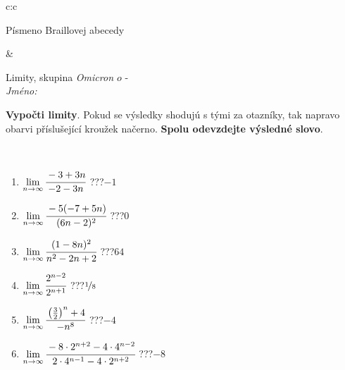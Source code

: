 \documentclass[10pt]{report}
\newcommand\omicron{o}
\begin{document}
\begin{tabular}{c:c}
\begin{minipage}[c][104.5mm][t]{0.5\linewidth}
\begin{center}
\begin{minipage}{0.20\linewidth}
\begin{center}
{\small Písmeno Braillovej abecedy}
\end{center}
\end{minipage}
\end{center}
\end{minipage}
&
\begin{minipage}[c][104.5mm][t]{0.5\linewidth}
\begin{center}
\vspace{7mm}
{\huge Limity, skupina \textit{Omicron $\omicron$} -}\\[5mm]
\textit{Jméno:}\phantom{xxxxxxxxxxxxxxxxxxxxxxxxxxxxxxxxxxxxxxxxxxxxxxxxxxxxxxxxxxxxxxxxx}\\[5mm]
\begin{minipage}{0.95\linewidth}
\begin{center}
\textbf{Vypočti limity}. Pokud se výsledky shodujú s tými za otazníky, tak napravo\\obarvi příslušející kroužek načerno. \textbf{Spolu odevzdejte výsledné slovo}.
\end{center}
\end{minipage}
\\[1mm]
\begin{minipage}{0.79\linewidth}
\begin{center}
\begin{varwidth}{\linewidth}
\begin{enumerate}
\normalsize
\item $\lim\limits_{n\to\infty}\cfrac{-3+3n}{-2-3n}$\quad \dotfill\; ???\;\dotfill \quad $-1$
\item $\lim\limits_{n\to\infty}\cfrac{-5(-7+5n)}{(6n-2)^2}$\quad \dotfill\; ???\;\dotfill \quad $0$
\item $\lim\limits_{n\to\infty}\cfrac{(1-8n)^2}{n^2-2n+2}$\quad \dotfill\; ???\;\dotfill \quad $64$
\item $\lim\limits_{n\to\infty}\cfrac{2^{n-2}}{2^{n+1}}$\quad \dotfill\; ???\;\dotfill \quad $\nicefrac{1}{8}$
\item $\lim\limits_{n\to\infty}\cfrac{\left(\frac{3}{2}\right)^n +4}{-n^{8}}$\quad \dotfill\; ???\;\dotfill \quad $-4$
\item $\lim\limits_{n\to\infty}\cfrac{-8\cdot 2^{n+2}-4\cdot 4^{n-2}}{2\cdot 4^{n-1}-4\cdot 2^{n+2}}$\quad \dotfill\; ???\;\dotfill \quad $-8$
\end{enumerate}
\end{varwidth}
\end{center}
\end{minipage}
\begin{minipage}{0.20\linewidth}

\end{minipage}
\end{center}
\end{minipage}
\end{tabular}
\end{document}
